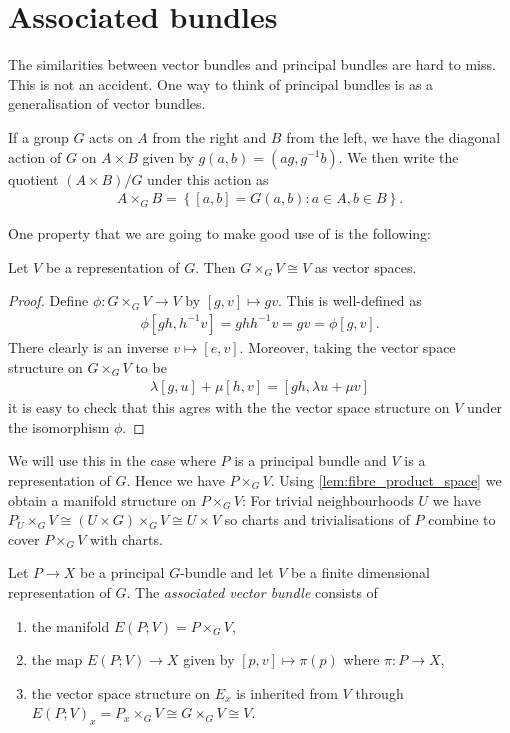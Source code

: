 \documentclass{article}
\begin{document}
\section{Associated bundles}

The similarities between vector bundles and principal bundles are
hard to miss. This is not an accident. One way to think of principal
bundles is as a generalisation of vector bundles.

If a group $G$ acts on $A$ from the right and $B$ from the left, we have the
diagonal action of $G$ on $A\times B$ given by $g(a,b)=(ag,{g}^{-1}b)$. We then write the quotient $(A\times B)/G$ under this action as
\begin{align*}
  A\times_G B = \left\lbrace{[a,b]=G(a,b) : a\in A, b\in B}\right\rbrace.
\end{align*}

One property that we are going to make good use of is the following:
\begin{lemma}\label{lem:fibre_product_space}
  Let $V$ be a representation of $G$. Then $G\times_G V \cong V$
  as vector spaces.
  \begin{proof}
    Define $\phi:G\times_G V\to V$ by $[g,v]\mapsto gv$. This is well-defined
    as
    \begin{align*}
      \phi[gh,{h}^{-1}v]=gh{h}^{-1}v=gv=\phi[g,v].
    \end{align*}
    There clearly is an inverse $v\mapsto [e,v]$. Moreover,
    taking the vector space structure on $G\times_G V$ to be
    \begin{align}\label{eq:fibre_product_space}
      \lambda[g,u] + \mu[h,v] = [gh,\lambda u + \mu v]
    \end{align}
    it is easy to check that this agres with the the vector space
    structure on $V$ under the isomorphism $\phi$.
  \end{proof}
\end{lemma}
We will use this in the case where $P$ is a principal bundle and $V$ is
a representation of $G$. Hence we have $P\times_G V$. Using
\ref{lem:fibre_product_space} we obtain a manifold structure on
$P\times_G V$: For trivial neighbourhoods $U$ we have
$P_U\times_G V\cong (U\times G)\times_G V\cong U\times V$
so charts and trivialisations of $P$ combine to cover $P\times_G V$
with charts.

\begin{definition}
  Let $P\to X$ be a principal $G$-bundle and let $V$ be a finite dimensional
  representation of $G$. The \emph{associated vector bundle} consists of
  \begin{enumerate}
    \item the manifold $E(P;V)=P\times_G V$,
    \item the map $E(P;V)\to X$ given by $[p,v]\mapsto \pi(p)$
      where $\pi:P\to X$,
    \item the vector space structure on $E_x$ is inherited
      from $V$ through $E(P;V)_x = P_x \times_G V \cong G\times_G V \cong V$.
  \end{enumerate}
\end{definition}
\end{document}
